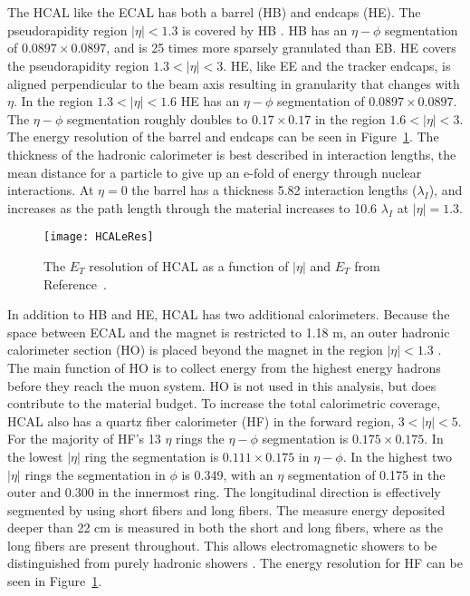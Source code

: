   \DIFaddbegin \section{}
    \DIFaddend The HCAL like the ECAL has both a barrel (HB) and endcaps (HE).
    The pseudorapidity region $|\eta|<1.3$ is covered by HB \cite{tCmsE}. 
    HB has an $\eta-\phi$ segmentation of $0.0897\times0.0897$, and is 25 times more
    	sparsely granulated than EB.
    HE covers the pseudorapidity region $1.3<|\eta|<3$.
    HE, like EE and the tracker endcaps, is aligned perpendicular to the beam axis
    	resulting in granularity that changes with $\eta$.
    In the region $1.3 <|\eta|< 1.6$ HE has an $\eta-\phi$ segmentation of 
    	$0.0897\times0.0897$.
    The $\eta-\phi$ segmentation roughly doubles to $0.17\times0.17$ in the region
    	$1.6 <|\eta|< 3$.
    The energy resolution of the barrel and endcaps can be seen in  
    	Figure~\ref{HCALeRes}.
    The thickness of the hadronic calorimeter is best described in interaction
    	lengths, the mean distance for a particle to give up an e-fold of energy
    	through nuclear interactions. 
    At $\eta = 0$ the barrel has a thickness 5.82 interaction lengths 
    	($\lambda_{I}$), and increases as the path length through the material 
    	increases to 10.6 $\lambda_{I}$ at $|\eta| = 1.3$.
    \begin{figure}[h]
      \centering
        \texttt{[image: HCALeRes]}
      \caption{The $E_{T}$ resolution of HCAL as a function of $|\eta|$ and $E_{T}$
    	from Reference~\cite{tCmsE}.}
      \label{HCALeRes}
    \end{figure}

    In addition to HB and HE, HCAL has two additional calorimeters.
    Because the space between ECAL and the magnet is restricted to 1.18 m, an
    	outer hadronic calorimeter section (HO) is placed beyond the magnet
    	in the region $|\eta|<1.3$ \cite{tCmsE}.
    The main function of HO is to collect energy from the highest energy hadrons
    	before they reach the muon system.
    HO is not used in this analysis, but does contribute to the material budget. 
    To increase the total calorimetric coverage, HCAL also has a quartz fiber 
    	calorimeter (HF) in the forward region, $3 < |\eta| < 5$.
    For the majority of HF's 13 $\eta$ rings the $\eta-\phi$ segmentation is 
    	$0.175\times0.175$.
    In the lowest $|\eta|$ ring the segmentation is $0.111\times0.175$ in 
    	$\eta-\phi$.
    In the highest two $|\eta|$ rings the segmentation in $\phi$ is 0.349, with an
    	$\eta$ segmentation of 0.175 in the outer and 0.300 in the innermost 
    	ring. 
    The longitudinal direction is effectively segmented by using short fibers and
    	long fibers.
    The measure energy deposited deeper than 22 cm is measured in both the short
    	and long fibers, where as the long fibers are present throughout.
    This allows electromagnetic showers to be distinguished from purely hadronic 
    	showers \cite{tCmsE}.
    The energy resolution for HF can be seen in Figure~\ref{HCALeRes}.  

